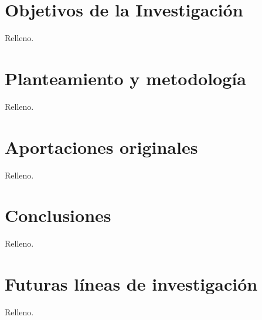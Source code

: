 

\section*{Objetivos de la Investigación}

Relleno.

\section*{Planteamiento y metodología}

Relleno.


\section*{Aportaciones originales}

Relleno.


\section*{Conclusiones}

Relleno.


\section*{Futuras líneas de investigación}

Relleno.




